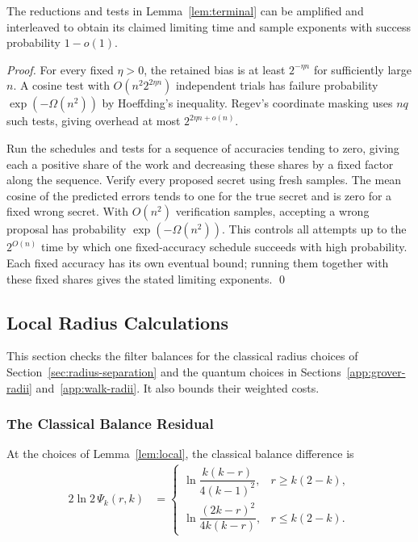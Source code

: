 \documentclass[runningheads,envcountsame,envcountsect,orivec]{llncs}
\begin{document}
\begin{lemma}
\label{lem:uniform-limit}
The reductions and tests in Lemma~\ref{lem:terminal} can
be amplified and interleaved to obtain its claimed
limiting time and sample exponents with success
probability $1-o(1)$.
\end{lemma}

\begin{proof}
For every fixed $\eta>0$, the retained bias is at least
$2^{-\eta n}$ for sufficiently large $n$. A cosine test
with $O(n^2 2^{2\eta n})$ independent trials has failure
probability $\exp(-\Omega(n^2))$ by Hoeffding's inequality.
Regev's coordinate masking uses $nq$ such tests, giving
overhead at most $2^{2\eta n+o(n)}$.

Run the schedules and tests for a sequence of accuracies tending
to zero, giving each a positive share of the work and decreasing
these shares by a fixed factor along the sequence. Verify every proposed secret using fresh
samples. The mean cosine of the predicted errors tends
to one for the true secret and is zero for a fixed wrong
secret. With $O(n^2)$ verification samples, accepting a
wrong proposal has probability $\exp(-\Omega(n^2))$.
This controls all attempts up to the $2^{O(n)}$ time by
which one fixed-accuracy schedule succeeds with high
probability. Each fixed accuracy has its own eventual
bound; running them together with these fixed shares gives
the stated limiting exponents.
\qed
\end{proof}

\subsection{Local Radius Calculations}
\label{app:separation-details}

This section checks the filter balances for the classical radius choices
of Section~\ref{sec:radius-separation} and the quantum choices in
Sections~\ref{app:grover-radii} and~\ref{app:walk-radii}.
It also bounds their weighted costs.

\subsubsection{The Classical Balance Residual}



At the choices of Lemma~\ref{lem:local}, the classical balance difference is
\begin{align}
 2\ln 2\,\Psi_k(r,k)
 &=
 \begin{cases}
  \ln\!\dfrac{k(k-r)}{4(k-1)^2},&r\ge k(2-k),\\[1mm]
  \ln\!\dfrac{(2k-r)^2}{4k(k-r)},&r\le k(2-k).
 \end{cases}
 \label{eq:c-residual}
\end{align}
\end{document}
